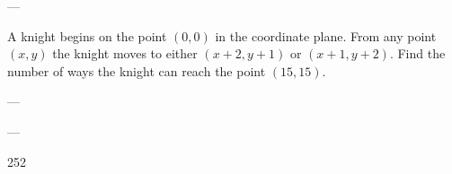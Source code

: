 
---

A knight begins on the point $(0,0)$ in the coordinate plane. From any point $(x,y)$ the knight moves to either $(x+2,y+1)$ or $(x+1,y+2)$. Find the number of ways the knight can reach the point $(15,15)$. 

---

---

252
